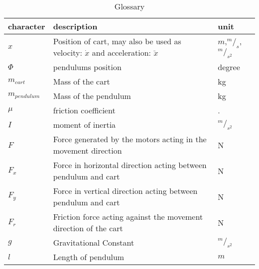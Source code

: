 \begin{table}[H]
\centering
\caption{Glossary }
\label{tab:glossary}
\begin{tabular}{|l|l|l|}
\hline
\rowcolor[HTML]{C0C0C0} 
character      & description                                                                            & unit                     \\ \hline
$x$            & Position of cart, may also be used as velocity: $\dot{x}$ and acceleration: $\ddot{x}$ & $m$,$^m/_s$, $^m/_{s^2}$ \\ \hline
$\Phi$         & pendulums position                                                                     & degree                   \\ \hline
$m_{cart}$     & Mass of the cart                                                                       & kg                       \\ \hline
$m_{pendulum}$ & Mass of the pendulum                                                                   & kg                       \\ \hline
$\mu$          & friction coefficient                                                                   & .                        \\ \hline
$I$            & moment of inertia                                                                      & $^m/_{s^2}$               \\ \hline
$F$            & Force generated by the motors acting in the movement direction                         & N                        \\ \hline
$F_x$          & Force in horizontal direction acting between pendulum and cart                         & N                        \\ \hline
$F_y$          & Force in vertical direction acting between pendulum and cart                           & N                        \\ \hline
$F_r$          & Friction force acting against the movement direction of the cart                       & N                        \\ \hline
$g$            & Gravitational Constant                                                                 & $^m/_{s^2}$               \\ \hline
$l$            & Length of pendulum                                                                     & $m$                      \\ \hline

\end{tabular}
\end{table}
